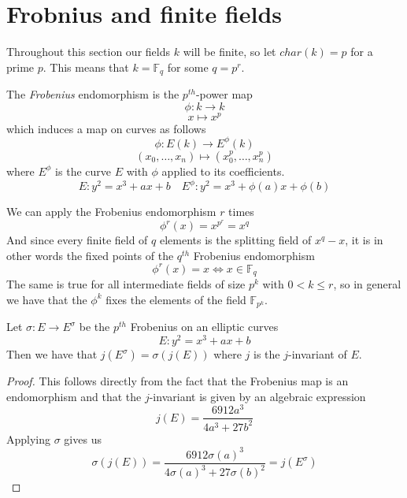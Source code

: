 \section{Frobnius and finite fields} \label{frob}
Throughout this section our fields $k$ will be finite, so let $char(k) = p$ for
a prime $p$. This means that $k = \mathbb{F}_{q}$ for some $q = p^r$.

\begin{mydef}
 The \emph{Frobenius} endomorphism is the $p^{th}$-power map
$$ \phi: k \rightarrow k $$
$$ x \mapsto x^p $$
which induces a map on curves as follows
$$ \phi: E(k) \rightarrow E^{\phi}(k) $$
$$ (x_0,\ldots , x_n) \mapsto (x_0^p, \ldots , x_n^p) $$
where $E^{\phi}$ is the curve $E$ with $\phi$ applied to its coefficients.
$$E: y^2 = x^3 + ax + b \quad E^{\phi}: y^2 = x^3 + \phi(a)x + \phi(b) $$
\end{mydef}

We can apply the Frobenius endomorphism $r$ times $$\phi^r(x) = x^{p^r} = x^q$$
And since every finite field of $q$ elements is the splitting field of $x^{q}-x$, it is in other words
the fixed points of the $q^{th}$ Frobenius endomorphism
$$ \phi^r(x) = x \iff x \in \mathbb{F}_q $$
The same is true for all intermediate fields of size $p^k$ with $0 < k \leq r$, so in general
we have that the $\phi^k$ fixes the elements of the field $\mathbb{F}_{p^k}$.

\begin{prop}
 Let $\sigma: E \rightarrow E^\sigma$ be the $p^{th}$ Frobenius on an elliptic curves
  $$ E: y^2 = x^3 + ax + b$$
Then we have that $j(E^\sigma) = \sigma(j(E))$ where $j$ is the $j$-invariant of $E$.
\end{prop}
\begin{proof}
 This follows directly from the fact that the Frobenius map is an endomorphism and that
the $j$-invariant is given by an algebraic expression \cite{AEC}
$$j(E) = \frac{6912 a^3}{4a^3 + 27b^2}$$ 
Applying $\sigma$ gives us
$$\sigma(j(E)) = \frac{6912 \sigma(a)^3}{4\sigma(a)^3 + 27 \sigma(b)^2} = j(E^\sigma)$$
\end{proof}

